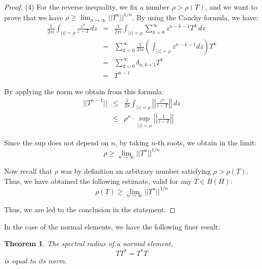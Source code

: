 \documentclass[12pt]{amsbook}
\newtheorem{theorem}{Theorem}[chapter]
\begin{document}
\begin{proof}
(4) For the reverse inequality, we fix a number $\rho>\rho(T)$, and we want to prove that we have $\rho\geq\lim_{n\to\infty}||T^n||^{1/n}$. By using the Cauchy formula, we have:
\begin{eqnarray*}
\frac{1}{2\pi i}\int_{|z|=\rho}\frac{z^n}{z-T}\,dz
&=&\frac{1}{2\pi i}\int_{|z|=\rho}\sum_{k=0}^\infty z^{n-k-1}T^k\,dz\\
&=&\sum_{k=0}^\infty\frac{1}{2\pi i}\left(\int_{|z|=\rho}z^{n-k-1}dz\right)T^k\\
&=&\sum_{k=0}^\infty\delta_{n,k+1}T^k\\
&=&T^{n-1}
\end{eqnarray*}

By applying the norm we obtain from this formula:
\begin{eqnarray*}
||T^{n-1}||
&\leq&\frac{1}{2\pi}\int_{|z|=\rho}\left|\left|\frac{z^n}{z-T}\right|\right|\,dz\\
&\leq&\rho^n\cdot\sup_{|z|=\rho}\left|\left|\frac{1}{z-T}\right|\right|
\end{eqnarray*}

Since the sup does not depend on $n$, by taking $n$-th roots, we obtain in the limit:
$$\rho\geq\lim_{n\to\infty}||T^n||^{1/n}$$

Now recall that $\rho$ was by definition an arbitrary number satisfying $\rho>\rho(T)$. Thus, we have obtained the following estimate, valid for any $T\in B(H)$:
$$\rho(T)\geq\lim_{n\to\infty}||T^n||^{1/n}$$

Thus, we are led to the conclusion in the statement.
\end{proof}

In the case of the normal elements, we have the following finer result:


\begin{theorem}
The spectral radius of a normal element,
$$TT^*=T^*T$$
is equal to its norm.
\end{theorem}
\end{document}

